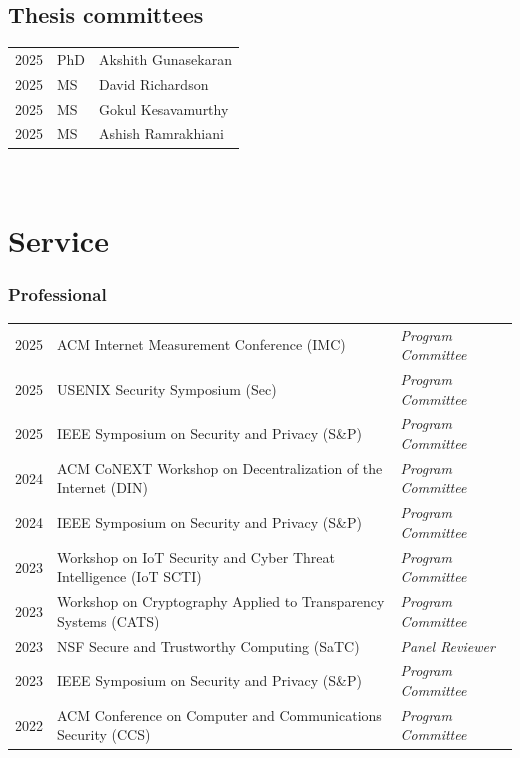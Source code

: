 \documentclass[10pt,singlecolumn]{article} %
\begin{document}
\subsection*{Thesis committees}

\begin{tabular}{rll}
2025 & PhD & Akshith Gunasekaran \\
2025 & MS & David Richardson \\ 
2025 & MS & Gokul Kesavamurthy \\
2025 & MS & Ashish Ramrakhiani \\

\end{tabular}\\



\section{Service}

\subsubsection*{Professional}

\begin{tabular}{rll}
2025 & ACM Internet Measurement Conference (IMC) & \emph{Program Committee} \\ 
2025 & USENIX Security Symposium (Sec) & \emph{Program Committee} \\ 
2025 & IEEE Symposium on Security and Privacy (S\&P) & \emph{Program Committee} \\ 
2024 & ACM CoNEXT Workshop on Decentralization of the Internet (DIN) & \emph{Program Committee} \\ 
2024 & IEEE Symposium on Security and Privacy (S\&P) & \emph{Program Committee} \\ 
2023 & Workshop on IoT Security and Cyber Threat Intelligence (IoT SCTI) & \emph{Program Committee} \\
2023 & Workshop on Cryptography Applied to Transparency Systems (CATS) & \emph{Program Committee} \\ 
2023 & NSF Secure and Trustworthy Computing (SaTC) & \emph{Panel Reviewer} \\
2023 & IEEE Symposium on Security and Privacy (S\&P) & \emph{Program Committee} \\ 
2022 & ACM Conference on Computer and Communications Security (CCS) & \emph{Program Committee} \\
\end{tabular} \\
\end{document}
